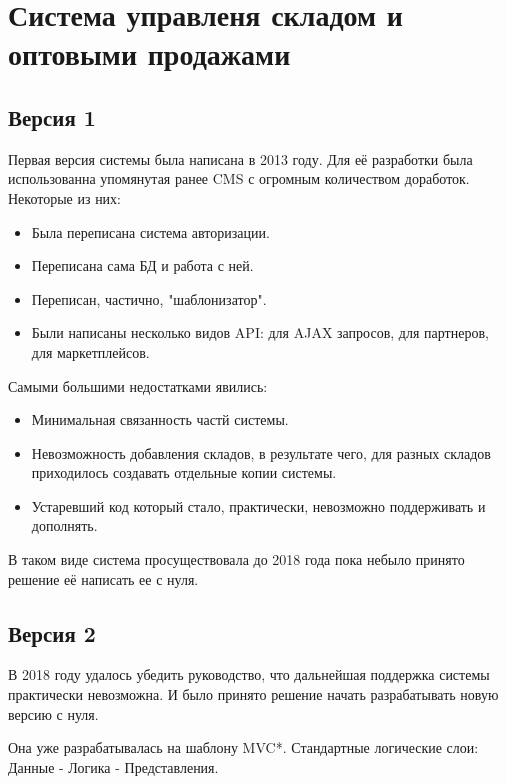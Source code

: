 \documentclass[10pt]{tpl/developercv} %
\begin{document}
\section{Система управленя складом и оптовыми продажами}
\subsection{Версия 1}

Первая версия системы была написана в 2013 году. Для её разработки была использованна упомянутая ранее CMS с огромным количеством доработок. Некоторые из них:
\begin{itemize}
  \item Была переписана система авторизации.
  \item Переписана сама БД и работа с ней.
  \item Переписан, частично, "шаблонизатор".
  \item Были написаны несколько видов API: для AJAX запросов, для партнеров, для маркетплейсов.
\end{itemize}

Самыми большими недостатками явились:
\begin{itemize}
  \item Минимальная связанность частй системы.
  \item Невозможность добавления складов, в результате чего, для разных складов приходилось создавать отдельные копии системы.
  \item Устаревший код который стало, практически, невозможно поддерживать и дополнять.
\end{itemize}

В таком виде система просуществовала до 2018 года пока небыло принято решение её написать ее с нуля.

\subsection{Версия 2}
В 2018 году удалось убедить руководство, что дальнейшая поддержка системы практически невозможна. И было принято решение начать разрабатывать новую версию с нуля.

Она уже разрабатывалась на шаблону MVC*. Стандартные логические слои: Данные - Логика - Представления.
\paragraph{}
\end{document}
